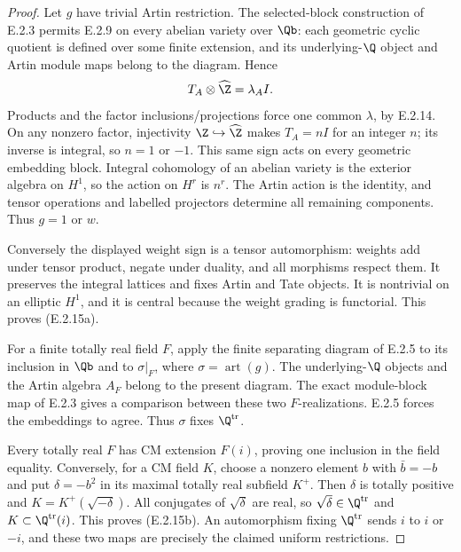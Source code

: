 \begin{proof}
Let \(g\) have trivial Artin restriction. The selected-block
construction of E.2.3 permits E.2.9 on every abelian variety over
\(\Qb\): each geometric cyclic quotient is defined over some
finite extension, and its underlying-\(\Q\) object and Artin
module maps belong to the diagram. Hence
\[
 T_A\otimes\widehat\Z=\lambda_A I .
\]
Products and the factor inclusions/projections force one common
\(\lambda\), by E.2.14. On any nonzero factor, injectivity
\(\Z\hookrightarrow\widehat\Z\) makes \(T_A=nI\) for an integer
\(n\); its inverse is integral, so \(n=1\) or \(-1\).
This same sign acts on every geometric embedding block.
Integral cohomology of an abelian variety is the exterior algebra
on \(H^1\), so the action on \(H^r\) is \(n^r\).
The Artin action is the identity, and tensor operations and
labelled projectors determine all remaining components.
Thus \(g=1\) or \(w\).

Conversely the displayed weight sign is a tensor automorphism:
weights add under tensor product, negate under duality, and all
morphisms respect them. It preserves the integral lattices and
fixes Artin and Tate objects. It is nontrivial on an elliptic
\(H^1\), and it is central because the weight grading is
functorial. This proves (E.2.15a).

For a finite totally real field \(F\), apply the finite separating
diagram of E.2.5 to its inclusion in \(\Qb\) and to
\(\sigma|_F\), where \(\sigma=\operatorname{art}(g)\).
The underlying-\(\Q\) objects and the Artin algebra \(A_F\)
belong to the present diagram. The exact module-block map of
E.2.3 gives a comparison between these two \(F\)-realizations.
E.2.5 forces the embeddings to agree. Thus \(\sigma\) fixes
\(\Q^{\mathrm{tr}}\).

Every totally real \(F\) has CM extension \(F(i)\), proving one
inclusion in the field equality. Conversely, for a CM field
\(K\), choose a nonzero element \(b\) with \(\bar b=-b\) and
put \(\delta=-b^2\) in its maximal totally real subfield \(K^+\).
Then \(\delta\) is totally positive and
\(K=K^+(\sqrt{-\delta})\).
All conjugates of \(\sqrt{\delta}\) are real, so
\(\sqrt{\delta}\in\Q^{\mathrm{tr}}\) and
\(K\subset\Q^{\mathrm{tr}}(i)\).
This proves (E.2.15b). An automorphism fixing \(\Q^{\mathrm{tr}}\)
sends \(i\) to \(i\) or \(-i\), and these two maps are precisely
the claimed uniform restrictions.
\end{proof}

